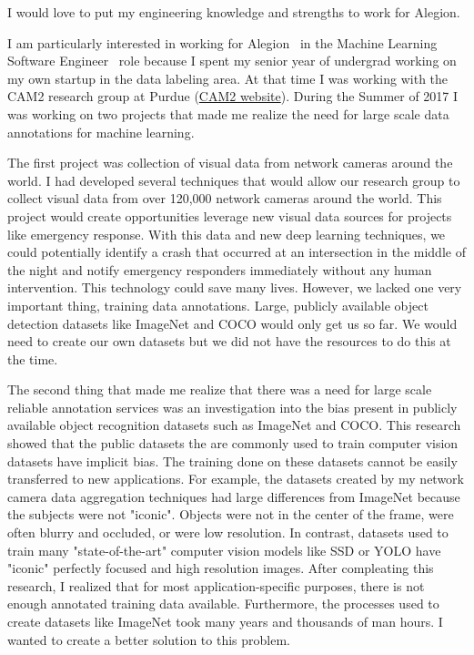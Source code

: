 \documentclass[10pt]{article}
\newcommand{\cvdurationstyle}[1]{{\small\cvdurationfont\textcolor{cvdurationcolor}{#1}}}
\newlength{\cvaftersectionskipamount}
\newcommand{\company}{Alegion}
\newcommand{\job}{Machine Learning Software Engineer}
\begin{document}

\vspace{4\cvaftersectionskipamount}

\noindent I would love to put my engineering knowledge and strengths to work for \company. 

\vspace{2\cvaftersectionskipamount}

I am particularly interested in working for \company~ in the \job~  role because I spent my senior year of undergrad working on my own startup in the data labeling area. At that time I was working with the CAM2 research group at Purdue (\href{https://www.cam2project.net/}{CAM2 website}). During the Summer of 2017 I was working on two projects that made me realize the need for large scale data annotations for machine learning. 

The first project was collection of visual data from network cameras around the world. I had developed several techniques that would allow our research group to collect visual data from over 120,000 network cameras around the world. This project would create opportunities leverage new visual data sources for projects like emergency response. With this data and new deep learning techniques, we could potentially identify a crash that occurred at an intersection in the middle of the night and notify emergency responders immediately without any human intervention. This technology could save many lives. However, we lacked one very important thing, training data annotations. Large, publicly available object detection datasets like ImageNet and COCO would only get us so far. We would need to create our own datasets but we did not have the resources to do this at the time. 

The second thing that made me realize that there was a need for large scale reliable annotation services was an investigation into the bias present in publicly available object recognition datasets such as ImageNet and COCO. This research showed that the public datasets the are commonly used to train computer vision datasets have implicit bias. The training done on these datasets cannot be easily transferred to new applications. For example, the datasets created by my network camera data aggregation techniques had large differences from ImageNet because the subjects were not "iconic". Objects were not in the center of the frame, were often blurry and occluded, or were low resolution. In contrast, datasets used to train many "state-of-the-art" computer vision models like SSD or YOLO have "iconic" perfectly focused and high resolution images. After compleating this research, I realized that for most application-specific purposes, there is not enough annotated training data available. Furthermore, the processes used to create datasets like ImageNet took many years and thousands of man hours. I wanted to create a better solution to this problem. 
\end{document}
